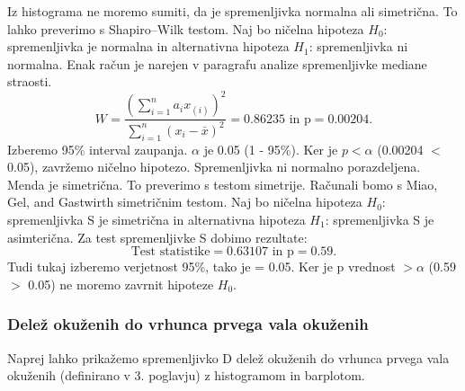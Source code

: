 \documentclass[a4paper,11pt]{article}
\begin{document}
Iz histograma ne moremo sumiti, da je spremenljivka normalna ali simetrična. To lahko preverimo s Shapiro–Wilk testom. Naj bo ničelna hipoteza \(H_0\): spremenljivka je normalna in alternativna hipoteza \(H_1\): spremenljivka ni normalna. Enak račun je narejen v paragrafu analize spremenljivke mediane straosti.
\[W = \frac{(\sum_{i = 1}^{n}a_i x_{(i)})^2}{\sum_{i = 1}^{n}(x_i - \overset{\_}{x})^2} = 0.86235 \text{ in p} = 0.00204. \]
Izberemo 95\% interval zaupanja. \(\alpha\) je 0.05 (1 - 95\%). Ker je \(p < \alpha\) (0.00204 \(<\) 0.05), zavržemo ničelno hipotezo. Spremenljivka ni normalno porazdeljena. Menda je simetrična. To preverimo s testom simetrije. Računali bomo s Miao, Gel, and Gastwirth simetričnim testom. Naj bo ničelna hipoteza \(H_0\): spremenljivka S je simetrična in alternativna hipoteza \(H_1\): spremenljivka S je asimterična. Za test spremenljivke S dobimo rezultate:
\[\text{Test statistike} = 0.63107 \text{ in p} =  0.59.\]
Tudi tukaj izberemo verjetnost 95\%, tako je \alpha = 0.05. Ker je p vrednost \(> \alpha\) (0.59 \(>\) 0.05) ne moremo zavrnit hipoteze \(H_0\).

\subsubsection{Delež okuženih do vrhunca prvega vala okuženih}
Naprej lahko prikažemo spremenljivko D delež okuženih do vrhunca prvega vala okuženih (definirano v 3. poglavju) z histogramom in barplotom.
\end{document}
